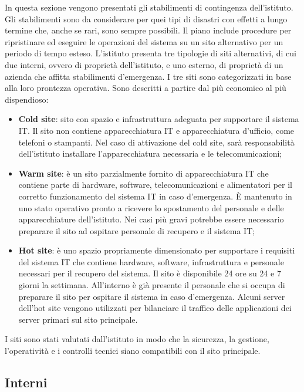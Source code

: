 \documentclass[12pt, a4paper, titlepage]{report}
\begin{document}
	In questa sezione vengono presentati gli stabilimenti di contingenza dell'istituto. Gli stabilimenti sono da considerare per quei tipi di disastri con effetti a lungo termine che, anche se rari, sono sempre possibili. Il piano include procedure per ripristinare ed eseguire le operazioni del sistema su un sito alternativo per un periodo di tempo esteso. L'istituto presenta tre tipologie di siti alternativi, di cui due interni, ovvero di proprietà dell'istituto, e uno esterno, di proprietà di un azienda che affitta stabilimenti d'emergenza. I tre siti sono categorizzati in base alla loro prontezza operativa. Sono descritti a partire dal più economico al più dispendioso:
	\begin{itemize}
		\item \textbf{Cold site}: sito con spazio e infrastruttura adeguata per supportare il sistema IT. Il sito non contiene apparecchiatura IT e apparecchiatura d'ufficio, come telefoni o stampanti. Nel caso di attivazione del cold site, sarà responsabilità dell'istituto installare l'apparecchiatura necessaria e le telecomunicazioni;
		\item \textbf{Warm site}: è un sito parzialmente fornito di apparecchiatura IT che contiene parte di hardware, software, telecomunicazioni e alimentatori per il corretto funzionamento del sistema IT in caso d'emergenza. È mantenuto in uno stato operativo pronto a ricevere lo spostamento del personale e delle apparecchiature dell'istituto. Nei casi più gravi potrebbe essere necessario preparare il sito ad ospitare personale di recupero e il sistema IT;
		\item \textbf{Hot site}: è uno spazio propriamente dimensionato per supportare i requisiti del sistema IT che contiene hardware, software, infrastruttura e personale necessari per il recupero del sistema. Il sito è disponibile 24 ore su 24 e 7 giorni la settimana. All'interno è già presente il personale che si occupa di preparare il sito per ospitare il sistema in caso d'emergenza. Alcuni server dell'hot site vengono utilizzati per bilanciare il traffico delle applicazioni dei server primari sul sito principale.
	\end{itemize}
	I siti sono stati valutati dall'istituto in modo che la sicurezza, la gestione, l'operatività e i controlli tecnici siano compatibili con il sito principale.

	
	\subsection{Interni} \label{interni}
	
\end{document}
